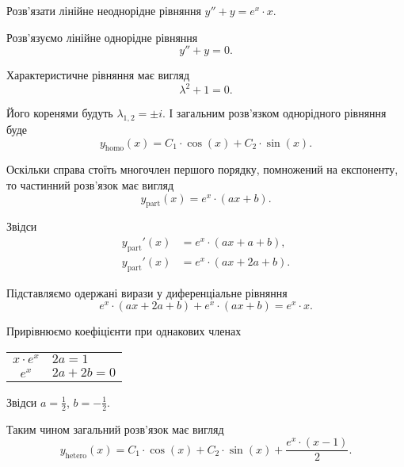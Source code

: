 \begin{example}
	Розв'язати лінійне неоднорідне рівняння $y'' + y = e^x \cdot x$.
\end{example}
\begin{solution}
	Розв'язуємо лінійне однорідне рівняння
	\begin{equation*}
		y'' + y = 0.
	\end{equation*}
	
	Характеристичне рівняння має вигляд
	\begin{equation*}
		\lambda^2 + 1 = 0.
	\end{equation*}

	Його коренями будуть $\lambda_{1, 2} = \pm i$. І загальним роз\-в'яз\-ком однорідного рівняння буде
	\begin{equation*}
		y_{\text{homo}}(x) = C_1 \cdot \cos (x) + C_2 \cdot \sin (x).
	\end{equation*}

	Оскільки справа стоїть многочлен першого порядку, помножений на експоненту, то частинний роз\-в'яз\-ок має вигляд
	\begin{equation*}
		y_{\text{part}}(x) = e^x \cdot (a x + b).
	\end{equation*}

	Звідси
	\begin{align*}
		y_{\text{part}}'(x) &= e^x \cdot (a x + a + b), \\
		y_{\text{part}}'(x) &= e^x \cdot (a x + 2 a + b).
	\end{align*}

	Підставляємо одержані вирази у диференціальне рівняння
	\begin{equation*}
		e^x \cdot (a x + 2 a + b) + e^x \cdot (a x + b) = e^x \cdot x.
	\end{equation*}

	Прирівнюємо коефіцієнти при однакових членах
	\begin{table}[H]
		\centering
		\begin{tabular}{c|l}
			$x \cdot e^x$ & $2 a = 1$ \\
			$e^x$ & $2 a + 2 b = 0$
		\end{tabular}
	\end{table}

	Звідси $a = \frac12$, $b = - \frac12$. \parvskip

	Таким чином загальний розв'язок має вигляд
	\begin{equation*}
		y_{\text{hetero}}(x) = C_1 \cdot \cos (x) + C_2 \cdot \sin (x) + \frac{e^x \cdot (x - 1)}{2}.
	\end{equation*}
\end{solution}

